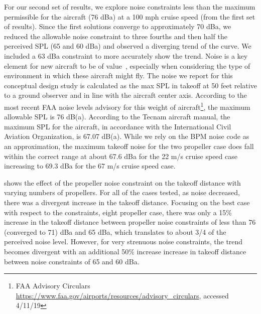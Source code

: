 \documentclass[conf]{new-aiaa}
\begin{document}
For our second set of results, we explore noise constraints less than the maximum permissible for the aircraft (76 dBa) at a 100 mph cruise speed (from the first set of results). Since the first solutions converge to approximately 70 dBa, we reduced the allowable noise constraint to three fourths and then half the perceived SPL (65 and 60 dBa) and observed a diverging trend of the curve.  We included a 63 dBa constraint to more accurately show the trend. Noise is a key element for new aircraft to be of value~\cite{Moore:2014aa}, especially when considering the type of environment in which these aircraft might fly. The noise we report for this conceptual design study is calculated as the max SPL in takeoff at 50 feet relative to a ground observer and in line with the aircraft center axis. According to the most recent FAA noise levels advisory for this weight of aircraft\footnote{FAA Advisory Circulars \href{https://www.faa.gov/airports/resources/advisory\_circulars/index.cfm/go/document.information/documentNumber/36-1H}{https://www.faa.gov/airports/resources/advisory\_circulars}, accessed 4/11/19}, the maximum allowable SPL is 76 dB(a). According to the Tecnam aircraft manual, the maximum SPL for the aircraft, in accordance with the International Civil Aviation Organization, is 67.07 dB(a). While we rely on the BPM noise code as an approximation, the maximum takeoff noise for the two propeller case does fall within the correct range at about 67.6 dBa for the 22 m/s cruise speed case increasing to 69.3 dBa for the 67 m/s cruise speed case.


 shows the effect of the propeller noise constraint on the takeoff distance with varying numbers of propellers. For all of the cases tested, as noise decreased, there was a divergent increase in the takeoff distance. Focusing on the best case with respect to the constraints, eight propeller case, there was only a 15\% increase in the takeoff distance between propeller noise constraints of less than 76 (converged to 71) dBa and 65 dBa, which translates to about 3/4 of the perceived noise level. However, for very strenuous noise constraints, the trend becomes divergent with an additional 50\% increase increase in takeoff distance between noise constraints of 65 and 60 dBa.
\end{document}
